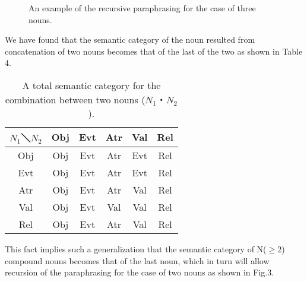 \vspace{2ex}
\begin{figure}[ht]
\begin{center}
\unitlength=1mm
\end{center}
\vspace{-1mm}
\caption{An example of the recursive paraphrasing for the case of three nouns.}
\end{figure}

We have found that the semantic category of the noun resulted from
concatenation of two nouns becomes that of the last of the two as
shown in Table 4.


\vspace{-1mm}
\begin{table}
\begin{center}
\caption{A total semantic category for the combination between two 
nouns ($N_1$・$N_2$).}
\begin{tabular}{|c|c|c|c|c|c|} \hline
   $N_1$＼$N_2$  &  Obj  &  Evt  &  Atr  &  Val  &  Rel\\ \hline
     Obj   &  Obj  &  Evt  &  Atr  &  Evt  &  Rel\\
     Evt   &  Obj  &  Evt  &  Atr  &  Evt  &  Rel\\
     Atr   &  Obj  &  Evt  &  Atr  &  Val  &  Rel\\
     Val   &  Obj  &  Evt  &  Val  &  Val  &  Rel\\
     Rel   &  Obj  &  Evt  &  Atr  &  Val  &  Rel\\
\hline
\end{tabular}
\end{center}
\end{table}


This fact implies such a generalization that the semantic category of
N($\geq2$) compound nouns becomes that of the last noun, which in turn will
allow recursion of the paraphrasing for the case of two nouns as shown
in Fig.3.





